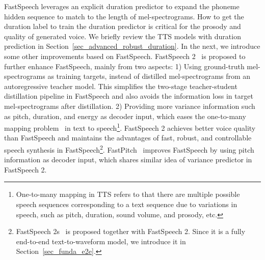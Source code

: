 \documentclass{article}
\begin{document}
FastSpeech leverages an explicit duration predictor to expand the phoneme hidden sequence to match to the length of mel-spectrograms. How to get the duration label to train the duration predictor is critical for the prosody and quality of generated voice. We briefly review the TTS models with duration prediction in Section~\ref{sec_advanced_robust_duration}. In the next, we introduce some other improvements based on FastSpeech. FastSpeech 2~\cite{ren2021fastspeech} is proposed to further enhance FastSpeech, mainly from two aspects: 1) Using ground-truth mel-spectrograms as training targets, instead of distilled mel-spectrograms from an autoregressive teacher model. This simplifies the two-stage teacher-student distillation pipeline in FastSpeech and also avoids the information loss in target mel-spectrograms after distillation. 2) Providing more variance information such as pitch, duration, and energy as decoder input, which eases the one-to-many mapping problem~\cite{jayne2012one,gadermayr2021asymmetric,wang2017tacotron,zhu2017toward} in text to speech\footnote{One-to-many mapping in TTS refers to that there are multiple possible speech sequences corresponding to a text sequence due to variations in speech, such as pitch, duration, sound volume, and prosody, etc.}. FastSpeech 2 achieves better voice quality than FastSpeech and maintains the advantages of fast, robust, and controllable speech synthesis in FastSpeech\footnote{FastSpeech 2s~\cite{ren2021fastspeech} is proposed together with FastSpeech 2. Since it is a fully end-to-end text-to-waveform model, we introduce it in Section~\ref{sec_funda_e2e}.}. FastPitch~\cite{lancucki2020fastpitch} improves FastSpeech by using pitch information as decoder input, which shares similar idea of variance predictor in FastSpeech 2.
\end{document}
